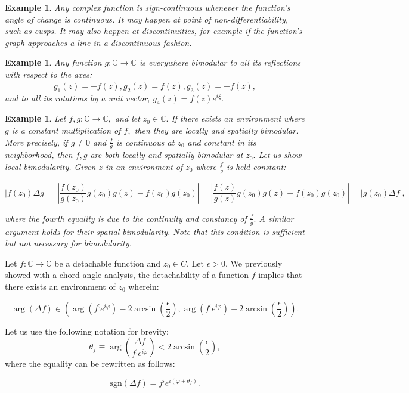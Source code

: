 \documentclass[11pt]{book}
\newtheorem{exm}[thm]{Example}
\begin{document}
\begin{exm}Any complex function is sign-continuous whenever the function's angle of change is continuous. It may happen at point of non-differentiability, such as cusps. It may also happen at discontinuities, for example if the function's graph approaches a line in a discontinuous fashion.
\end{exm}

\begin{exm}Any function $g:\mathbb{C}\longrightarrow\mathbb{C}$ is everywhere bimodular to all its reflections with respect to the axes: $$g_{1}\left(z\right)=-f\left(z\right), g_{2}\left(z\right)=\overline{f\left(z\right)}, g_{3}\left(z\right)=-\overline{f\left(z\right)},$$ and to all its rotations by a unit vector, $g_{4}\left(z\right)=f\left(z\right)e^{i\xi}.$
\end{exm}

\begin{exm}Let $f,g:\mathbb{C}\longrightarrow\mathbb{C},$ and let $z_{0}\in\mathbb{C}.$ If there exists an environment where $g$ is a constant multiplication of $f,$ then they are locally and spatially bimodular. More precisely, if $g\neq0$ and $\frac{f}{g}$ is continuous at $z_{0}$ and constant in its neighborhood, then $f,g$ are both locally and spatially bimodular at $z_{0}.$ Let us show local bimodularity. Given $z$ in an environment of $z_{0} $ where $\frac{f}{g}$ is held constant:

$$\left|f\left(z_{0}\right)\Delta g\right| =\left|\frac{f\left(z_{0}\right)}{g\left(z_{0}\right)}g\left(z_{0}\right)g\left(z\right)-f\left(z_{0}\right)g\left(z_{0}\right)\right|=\left|\frac{f\left(z\right)}{g\left(z\right)}g\left(z_{0}\right)g\left(z\right)-f\left(z_{0}\right)g\left(z_{0}\right)\right|=\left|g\left(z_{0}\right)\Delta f\right|,$$

where the fourth equality is due to the continuity and constancy of $\frac{f}{g}.$
A similar argument holds for their spatial bimodularity. Note that this condition is sufficient but not necessary for bimodularity.
\end{exm}

\begin{remark}Let $f:\mathbb{C}\longrightarrow\mathbb{C}$ be a detachable function and $z_{0}\in C.$ Let $\epsilon>0.$ We previously showed with a chord-angle analysis, the detachability of a function $f$ implies that there exists an environment of $z_{0}$ wherein:

$$\arg\left(\Delta f\right)\in\left(\arg\left(f^{;}e^{i\varphi}\right)-2\arcsin\left(\frac{\epsilon}{2}\right),\arg\left(f^{;}e^{i\varphi}\right)+2\arcsin\left(\frac{\epsilon}{2}\right)\right).$$

Let us use the following notation for brevity:
$$\theta_{f}\equiv\arg\left(\frac{\Delta f}{f^{;}e^{i\varphi}}\right)<2\arcsin\left(\frac{\epsilon}{2}\right)\label{theta_f_bound},$$ where the equality can be rewritten as follows:

$$\text{sgn}\left(\Delta f\right)=f^{;}e^{i\left(\varphi+\theta_{f}\right)}\label{sgn_df_formula}.$$
\end{remark}
\end{document}
